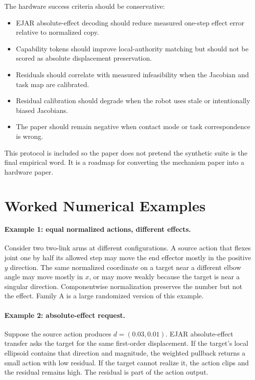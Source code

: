 \documentclass{article}
\begin{document}
The hardware success criteria should be conservative:
\begin{itemize}
\item EJAR absolute-effect decoding should reduce measured one-step effect error relative to normalized copy.
\item Capability tokens should improve local-authority matching but should not be scored as absolute displacement preservation.
\item Residuals should correlate with measured infeasibility when the Jacobian and task map are calibrated.
\item Residual calibration should degrade when the robot uses stale or intentionally biased Jacobians.
\item The paper should remain negative when contact mode or task correspondence is wrong.
\end{itemize}

This protocol is included so the paper does not pretend the synthetic suite is the final empirical word. It is a roadmap for converting the mechanism paper into a hardware paper.

\section{Worked Numerical Examples}

\paragraph{Example 1: equal normalized actions, different effects.}
Consider two two-link arms at different configurations. A source action that flexes joint one by half its allowed step may move the end effector mostly in the positive $y$ direction. The same normalized coordinate on a target near a different elbow angle may move mostly in $x$, or may move weakly because the target is near a singular direction. Componentwise normalization preserves the number but not the effect. Family A is a large randomized version of this example.

\paragraph{Example 2: absolute-effect request.}
Suppose the source action produces $d=(0.03,0.01)$. EJAR absolute-effect transfer asks the target for the same first-order displacement. If the target's local ellipsoid contains that direction and magnitude, the weighted pullback returns a small action with low residual. If the target cannot realize it, the action clips and the residual remains high. The residual is part of the action output.
\end{document}
